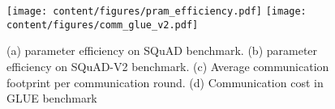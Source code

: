 \begin{figure}
\vspace{-20px}
  \centering
    \resizebox{\columnwidth}{!}
{
  \texttt{[image: content/figures/pram\_efficiency.pdf]}
  \texttt{[image: content/figures/comm\_glue\_v2.pdf]}
  }
  \vspace{-10px}
  \caption{(a) parameter efficiency on SQuAD benchmark. (b) parameter efficiency on SQuAD-V2 benchmark.  (c) Average communication footprint per communication round. (d) Communication cost in GLUE benchmark}
  \label{fig:squad_param_efficiency}
  \vspace{-10px}
\end{figure}
